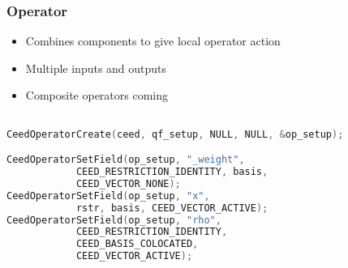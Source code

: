 \documentclass{beamer}
\begin{document}

\begin{frame}[fragile]
\begin{center}
\frametitle{Operator}

\begin{itemize}

\item Combines components to give local operator action\\

\item Multiple inputs and outputs\\

\item Composite operators coming\\

\end{itemize}

{\small
\begin{lstlisting}[language=C]

CeedOperatorCreate(ceed, qf_setup, NULL, NULL, &op_setup);

CeedOperatorSetField(op_setup, "_weight",
            CEED_RESTRICTION_IDENTITY, basis,
            CEED_VECTOR_NONE);
CeedOperatorSetField(op_setup, "x",
            rstr, basis, CEED_VECTOR_ACTIVE);
CeedOperatorSetField(op_setup, "rho",
            CEED_RESTRICTION_IDENTITY,
            CEED_BASIS_COLOCATED,
            CEED_VECTOR_ACTIVE);

\end{lstlisting}
}

\end{center}
\end{frame}

\end{document}
